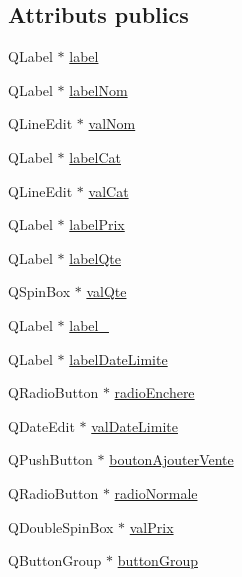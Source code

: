 \subsection*{Attributs publics}
\begin{DoxyCompactItemize}
\item 
Q\-Label $\ast$ \hyperlink{class_ui___dialog_ajouter_vente_a0148c009801a386f05f72bb1eb85138a}{label}
\item 
Q\-Label $\ast$ \hyperlink{class_ui___dialog_ajouter_vente_a124aae2b361f68cd4e4999a4d5c81c36}{label\-Nom}
\item 
Q\-Line\-Edit $\ast$ \hyperlink{class_ui___dialog_ajouter_vente_a7f6dc97a576b62dc8412a347ec2acb25}{val\-Nom}
\item 
Q\-Label $\ast$ \hyperlink{class_ui___dialog_ajouter_vente_a1ad88f317080e18e9b9855589dc73ac1}{label\-Cat}
\item 
Q\-Line\-Edit $\ast$ \hyperlink{class_ui___dialog_ajouter_vente_a8fd18dbf5b8788ff61cad46e2bbf9cc0}{val\-Cat}
\item 
Q\-Label $\ast$ \hyperlink{class_ui___dialog_ajouter_vente_a2bc88408689024a4377bc0e2171c19d9}{label\-Prix}
\item 
Q\-Label $\ast$ \hyperlink{class_ui___dialog_ajouter_vente_a6c8d4acb3eea5f28abe8cee46319ff40}{label\-Qte}
\item 
Q\-Spin\-Box $\ast$ \hyperlink{class_ui___dialog_ajouter_vente_a763e8a0d9e253d6da640fbac8b02459c}{val\-Qte}
\item 
Q\-Label $\ast$ \hyperlink{class_ui___dialog_ajouter_vente_a3288030f764fff68a7e443c490fe969d}{label\-\_}
\item 
Q\-Label $\ast$ \hyperlink{class_ui___dialog_ajouter_vente_adee51e354846fc85ed2a55004106373f}{label\-Date\-Limite}
\item 
Q\-Radio\-Button $\ast$ \hyperlink{class_ui___dialog_ajouter_vente_a6df6af19da8182b012f9ef7494eb8deb}{radio\-Enchere}
\item 
Q\-Date\-Edit $\ast$ \hyperlink{class_ui___dialog_ajouter_vente_a065ebc28106416bec403cecd4783c5c4}{val\-Date\-Limite}
\item 
Q\-Push\-Button $\ast$ \hyperlink{class_ui___dialog_ajouter_vente_a9b3dc0fa96393ccf69a41ae7776da8df}{bouton\-Ajouter\-Vente}
\item 
Q\-Radio\-Button $\ast$ \hyperlink{class_ui___dialog_ajouter_vente_a4ec0099d5d75035625d2f104a6882acc}{radio\-Normale}
\item 
Q\-Double\-Spin\-Box $\ast$ \hyperlink{class_ui___dialog_ajouter_vente_a125862f438ab182a8a49357a91bb37ef}{val\-Prix}
\item 
Q\-Button\-Group $\ast$ \hyperlink{class_ui___dialog_ajouter_vente_a7814de48092bce095428664bda3373d3}{button\-Group}
\end{DoxyCompactItemize}


